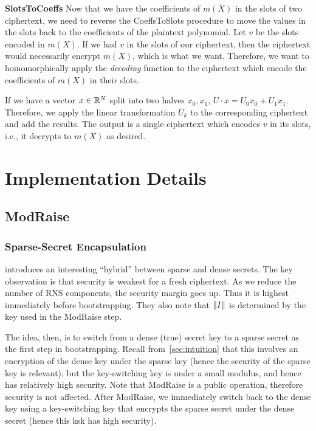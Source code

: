 \documentclass[../fheimpl.tex]{subfiles}
\begin{document}
    \textbf{SlotsToCoeffs} Now that we have the coefficients of $m(X)$ in the slots of two ciphertext, we need to reverse the CoeffsToSlots procedure to move the values in the slots back to the coefficients of the plaintext polynomial. Let $v$ be the slots encoded in $m(X)$. If we had $v$ in the slots of our ciphertext, then the ciphertext would necessarily encrypt $m(X)$, which is what we want. Therefore, we want to homomorphically apply the \emph{decoding} function to the ciphertext which encode the coefficients of $m(X)$ in their slots. 
    
    If we have a vector $x\in \mathbb{R}^N$ split into two halves $x_0, x_1$, $U\cdot x = U_0x_0+U_1x_1$. Therefore, we apply the linear transformation $U_k$ to the corresponding ciphertext and add the results. The output is a single ciphertext which encodes $v$ in its slots, i.e., it decrypts to $m(X)$ as desired.
	
    \section{Implementation Details}
    
    \subsection{ModRaise}
    
    \subsubsection{Sparse-Secret Encapsulation}
    \cite{cryptoeprint:2022/024} introduces an interesting ``hybrid'' between sparse and dense secrets. The key observation is that security is weakest for a fresh ciphertext. As we reduce the number of RNS components, the security margin goes up. Thus it is highest immediately before bootstrapping. They also note that $\lVert I\rVert$ is determined by the key used in the ModRaise step. 
    
    The idea, then, is to switch from a dense (true) secret key to a sparse secret as the first step in bootstrapping. Recall from~\cref{sec:intuition} that this involves an encryption of the dense key under the sparse key (hence the security of the sparse key is relevant), but the key-switching key is under a small modulus, and hence has relatively high security.	
    Note that ModRaise is a public operation, therefore security is not affected. After ModRaise, we immediately switch back to the dense key using a key-switching key that encrypts the sparse secret under the dense secret (hence this ksk has high security).
    
\end{document}
